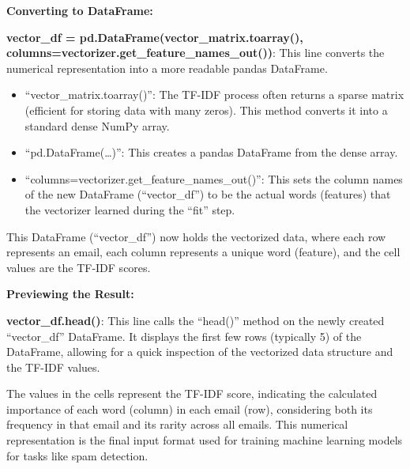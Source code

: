 \textbf{Converting to DataFrame:}

\textbf{vector\_df = pd.DataFrame(vector\_matrix.toarray(), columns=vectorizer.get\_feature\_names\_out())}: This line converts the numerical representation into a more readable pandas DataFrame.
\begin{itemize}
    \item ``vector\_matrix.toarray()'': The TF-IDF process often returns a sparse matrix (efficient for storing data with many zeros).
    This method converts it into a standard dense NumPy array.
    \item ``pd.DataFrame(\ldots)'': This creates a pandas DataFrame from the dense array.
    \item ``columns=vectorizer.get\_feature\_names\_out()'': This sets the column names of the new DataFrame (``vector\_df'') to be the actual words (features) that the vectorizer learned during the ``fit'' step.
\end{itemize}
This DataFrame (``vector\_df'') now holds the vectorized data, where each row represents an email, each column represents a unique word (feature), and the cell values are the TF-IDF scores.

\textbf{Previewing the Result:}

\textbf{vector\_df.head()}: This line calls the ``head()'' method on the newly created ``vector\_df'' DataFrame.
It displays the first few rows (typically 5) of the DataFrame, allowing for a quick inspection of the vectorized data structure and the TF-IDF values.

The values in the cells represent the TF-IDF score, indicating the calculated importance of each word (column) in each email (row), considering both its frequency in that email and its rarity across all emails.
This numerical representation is the final input format used for training machine learning models for tasks like spam detection.